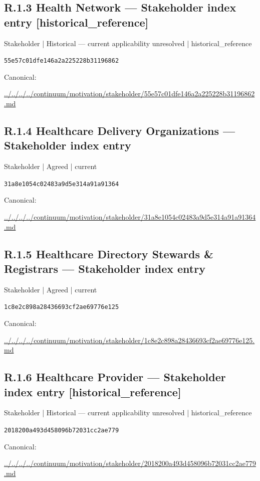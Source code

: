 \documentclass[10pt,a4paper]{article}
\begin{document}
\subsection*{R.1.3 Health Network — Stakeholder index entry [historical\_reference]}
\label{element-55e57c01dfe146a2a225228b31196862}
{\small Stakeholder | Historical — current applicability unresolved | historical\_reference}\par
\texttt{55e57c01dfe146a2a225228b31196862}\par
Canonical: \par
{\footnotesize\url{../../../../continuum/motivation/stakeholder/55e57c01dfe146a2a225228b31196862.md}}\par
\subsection*{R.1.4 Healthcare Delivery Organizations — Stakeholder index entry}
\label{element-31a8e1054c02483a9d5e314a91a91364}
{\small Stakeholder | Agreed | current}\par
\texttt{31a8e1054c02483a9d5e314a91a91364}\par
Canonical: \par
{\footnotesize\url{../../../../continuum/motivation/stakeholder/31a8e1054c02483a9d5e314a91a91364.md}}\par
\subsection*{R.1.5 Healthcare Directory Stewards \& Registrars — Stakeholder index entry}
\label{element-1c8e2c898a28436693cf2ae69776e125}
{\small Stakeholder | Agreed | current}\par
\texttt{1c8e2c898a28436693cf2ae69776e125}\par
Canonical: \par
{\footnotesize\url{../../../../continuum/motivation/stakeholder/1c8e2c898a28436693cf2ae69776e125.md}}\par
\subsection*{R.1.6 Healthcare Provider — Stakeholder index entry [historical\_reference]}
\label{element-2018200a493d458096b72031cc2ae779}
{\small Stakeholder | Historical — current applicability unresolved | historical\_reference}\par
\texttt{2018200a493d458096b72031cc2ae779}\par
Canonical: \par
{\footnotesize\url{../../../../continuum/motivation/stakeholder/2018200a493d458096b72031cc2ae779.md}}\par
\end{document}
